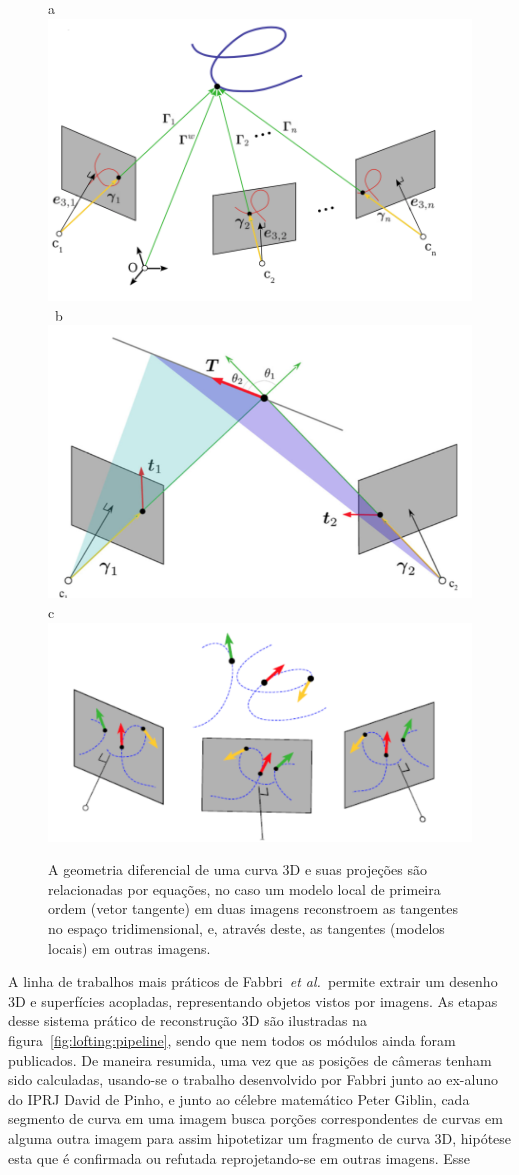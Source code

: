 \documentclass[a4paper,titlepage]{article}
\newcommand{\etal}{{\it et al.}}
\begin{document}
\begin{figure}[h]
    \centering
    a\includegraphics[width=0.45 \linewidth]{figs/FigureWW1/image51.png}\ 
    b\includegraphics[width=0.45 \linewidth]{figs/FigureWW1/image211.png}
    c\includegraphics[width=0.45 \linewidth]{figs/FigureWW1/image18.png}
\caption{A geometria diferencial de uma curva 3D e suas projeções são
  relacionadas por equações, no caso um modelo local de primeira ordem (vetor
  tangente) em duas imagens reconstroem as tangentes no espaço tridimensional,
  e, através deste, as tangentes (modelos locais) em outras imagens.
}
    \label{fig:WW1}
    \vspace{-0.2cm}
\end{figure}
A linha de trabalhos mais práticos de Fabbri~\etal\ permite extrair um desenho
3D e superfícies acopladas, representando objetos vistos por imagens. 
As etapas desse sistema prático de reconstrução 3D são ilustradas na
figura~\ref{fig:lofting:pipeline}, sendo que nem todos os módulos ainda foram
publicados.
De maneira resumida, uma vez que as posições de câmeras tenham sido calculadas,
usando-se o trabalho desenvolvido por Fabbri junto ao ex-aluno do IPRJ David de Pinho,
e junto ao célebre matemático Peter Giblin,
cada segmento de curva em uma imagem busca porções correspondentes de curvas em
alguma outra imagem para assim hipotetizar um fragmento de curva 3D, hipótese
esta que é confirmada ou refutada reprojetando-se em outras imagens. Esse
\end{document}
